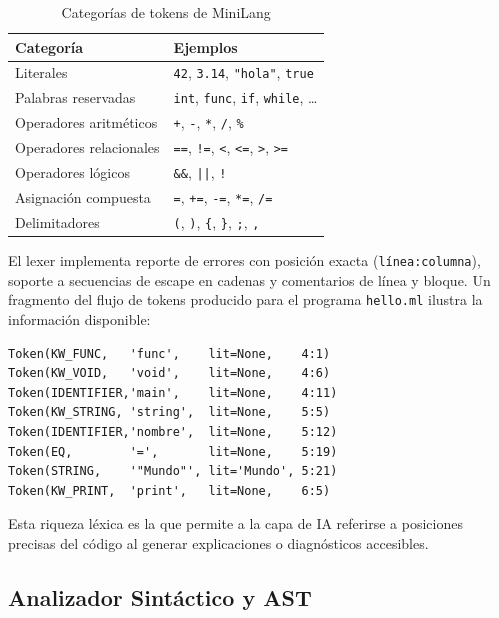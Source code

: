\documentclass[conference]{IEEEtran}
\begin{document}
\begin{table}[h]
\caption{Categorías de tokens de MiniLang}
\label{tab:tokens}
\centering
\begin{tabular}{ll}
\hline
\textbf{Categoría} & \textbf{Ejemplos} \\
\hline
Literales & \texttt{42}, \texttt{3.14}, \texttt{"hola"}, \texttt{true} \\
Palabras reservadas & \texttt{int}, \texttt{func}, \texttt{if}, \texttt{while}, \ldots \\
Operadores aritméticos & \texttt{+}, \texttt{-}, \texttt{*}, \texttt{/}, \texttt{\%} \\
Operadores relacionales & \texttt{==}, \texttt{!=}, \texttt{<}, \texttt{<=}, \texttt{>}, \texttt{>=} \\
Operadores lógicos & \texttt{\&\&}, \texttt{||}, \texttt{!} \\
Asignación compuesta & \texttt{=}, \texttt{+=}, \texttt{-=}, \texttt{*=}, \texttt{/=} \\
Delimitadores & \texttt{(}, \texttt{)}, \texttt{\{}, \texttt{\}}, \texttt{;}, \texttt{,} \\
\hline
\end{tabular}
\end{table}

El lexer implementa reporte de errores con posición exacta (\texttt{línea:columna}), soporte a secuencias de escape en cadenas y comentarios de línea y bloque. Un fragmento del flujo de tokens producido para el programa \texttt{hello.ml} ilustra la información disponible:

\begin{lstlisting}[language={},numbers=none,caption={Flujo de tokens anotado de hello.ml}]
Token(KW_FUNC,   'func',    lit=None,    4:1)
Token(KW_VOID,   'void',    lit=None,    4:6)
Token(IDENTIFIER,'main',    lit=None,    4:11)
Token(KW_STRING, 'string',  lit=None,    5:5)
Token(IDENTIFIER,'nombre',  lit=None,    5:12)
Token(EQ,        '=',       lit=None,    5:19)
Token(STRING,    '"Mundo"', lit='Mundo', 5:21)
Token(KW_PRINT,  'print',   lit=None,    6:5)
\end{lstlisting}

Esta riqueza léxica es la que permite a la capa de IA referirse a posiciones precisas del código al generar explicaciones o diagnósticos accesibles.

\subsection{Analizador Sintáctico y AST}
\end{document}
